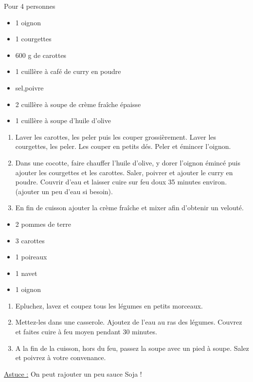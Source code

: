 \bigskip
{}
{Pour 4 personnes}{\begin{itemize}
	\item 1 oignon
	\item 1 courgettes
	\item 600 g de carottes
	\item 1 cuillère à café de curry en poudre
	\item sel,poivre
	\item 2 cuillère à soupe de crème fraîche épaisse
	\item 1 cuillère à soupe d'huile d'olive
\end{itemize}}
{\phantom{.}

\bigskip
\begin{enumerate}
	\item Laver les carottes, les peler puis les couper grossièrement. Laver les courgettes, les peler. Les couper en petits dés. Peler et émincer l'oignon.
	\item Dans une cocotte, faire chauffer l'huile d'olive, y dorer l'oignon émincé puis ajouter les courgettes et les carottes. Saler, poivrer et ajouter le curry en poudre. Couvrir d'eau et laisser cuire sur feu doux 35 minutes environ. (ajouter un peu d'eau si besoin).
	\item En fin de cuisson ajouter la crème fraîche et mixer afin d'obtenir un velouté.
\end{enumerate}

\bigskip
\phantom{.}}

\bigskip
{}
{}{\begin{itemize}
	\item 2 pommes de terre
	\item 3 carottes
	\item 1 poireaux
	\item 1 navet
	\item 1 oignon 
\end{itemize}}
{\begin{enumerate}
	\item Epluchez, lavez et coupez tous les légumes en petits morceaux.
	\item Mettez-les dans une casserole. Ajoutez de l'eau au ras des légumes. Couvrez et faites cuire à feu moyen pendant 30 minutes.
	\item A la fin de la cuisson, hors du feu, passez la soupe avec un pied à soupe. Salez et poivrez à votre convenance. 
\end{enumerate}

\underline{Astuce :} On peut rajouter un peu sauce Soja !}

